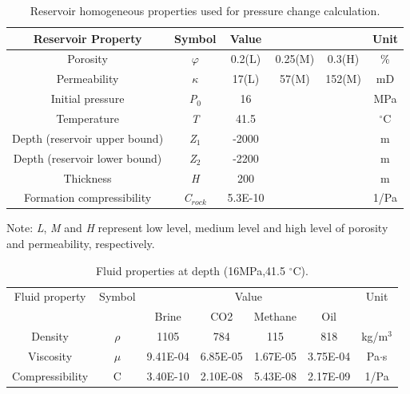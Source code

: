 \clearpage
\begin{table}[h!]
	\begin{center}
		\begin{threeparttable}
			\caption{Reservoir homogeneous properties used for pressure change calculation.}
			\label{tab:table1}
			\begin{tabular}{cccccc}
				\midrule
				Reservoir Property & Symbol & Value & & & Unit\\
				\midrule
				Porosity & $\varphi$ & 0.2(L) & 0.25(M) & 0.3(H) & \%\\
				Permeability & $\kappa$ & 17(L) & 57(M) & 152(M) & mD\\
				Initial pressure & \textit{P$_{0}$} & 16 & & & MPa\\
				Temperature & \textit{T} & 41.5 & & & $^{\circ}$C\\
				Depth (reservoir upper bound) & \textit{Z$_{1}$} & -2000 & & & m\\
				Depth (reservoir lower bound) & \textit{Z$_{2}$} & -2200 & & & m\\
				Thickness & \textit{H} & 200 & & & m\\
				Formation compressibility & \textit{C$_{rock}$} & 5.3E-10 & & & 1/Pa\\
				\midrule
			\end{tabular}
			\begin{tablenotes}
				\small
				\item Note: \textit{L}, \textit{M} and \textit{H} represent low level, medium level and high level of porosity and permeability, respectively.
			\end{tablenotes}
		\end{threeparttable}
	\end{center}
\end{table}

\clearpage
\begin{table}[h!]
	\begin{center}
		\caption{Fluid properties at depth (16MPa,41.5 $^{\circ}$C).}
		\label{tab:table2}
		\begin{tabular}{ccccccc}
			\midrule
			Fluid property & Symbol &\multicolumn{4}{c}{Value} & Unit \\
			\cmidrule(l){3-6}
			&& Brine & CO2 & Methane & Oil &\\
			\midrule
			Density & $\rho$ & 1105 & 784 & 115 & 818 & kg/m$^{3}$\\
			Viscosity & $\mu$ & 9.41E-04 & 6.85E-05 & 1.67E-05 & 3.75E-04 & Pa$\cdot$s\\
			Compressibility & C & 3.40E-10 & 2.10E-08 & 5.43E-08 & 2.17E-09 & 1/Pa\\
			\midrule
		\end{tabular}
	\end{center}
\end{table}

